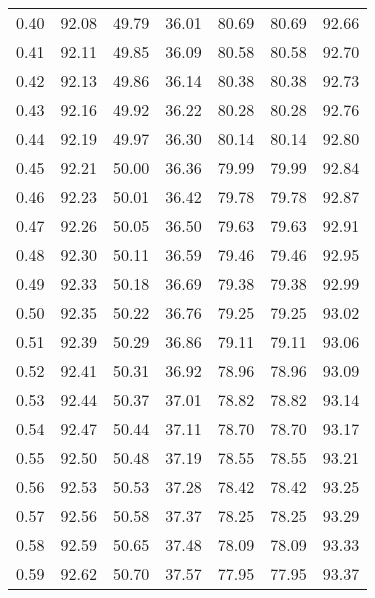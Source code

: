 \begin{tabular}{|c|c|c|c|c|c|c|}
      0.40 &     92.08 &     49.79 &      36.01 &   80.69 &      80.69 &         92.66 \\
      0.41 &     92.11 &     49.85 &      36.09 &   80.58 &      80.58 &         92.70 \\
      0.42 &     92.13 &     49.86 &      36.14 &   80.38 &      80.38 &         92.73 \\
      0.43 &     92.16 &     49.92 &      36.22 &   80.28 &      80.28 &         92.76 \\
      0.44 &     92.19 &     49.97 &      36.30 &   80.14 &      80.14 &         92.80 \\
      0.45 &     92.21 &     50.00 &      36.36 &   79.99 &      79.99 &         92.84 \\
      0.46 &     92.23 &     50.01 &      36.42 &   79.78 &      79.78 &         92.87 \\
      0.47 &     92.26 &     50.05 &      36.50 &   79.63 &      79.63 &         92.91 \\
      0.48 &     92.30 &     50.11 &      36.59 &   79.46 &      79.46 &         92.95 \\
      0.49 &     92.33 &     50.18 &      36.69 &   79.38 &      79.38 &         92.99 \\
      0.50 &     92.35 &     50.22 &      36.76 &   79.25 &      79.25 &         93.02 \\
      0.51 &     92.39 &     50.29 &      36.86 &   79.11 &      79.11 &         93.06 \\
      0.52 &     92.41 &     50.31 &      36.92 &   78.96 &      78.96 &         93.09 \\
      0.53 &     92.44 &     50.37 &      37.01 &   78.82 &      78.82 &         93.14 \\
      0.54 &     92.47 &     50.44 &      37.11 &   78.70 &      78.70 &         93.17 \\
      0.55 &     92.50 &     50.48 &      37.19 &   78.55 &      78.55 &         93.21 \\
      0.56 &     92.53 &     50.53 &      37.28 &   78.42 &      78.42 &         93.25 \\
      0.57 &     92.56 &     50.58 &      37.37 &   78.25 &      78.25 &         93.29 \\
      0.58 &     92.59 &     50.65 &      37.48 &   78.09 &      78.09 &         93.33 \\
      0.59 &     92.62 &     50.70 &      37.57 &   77.95 &      77.95 &         93.37 \\

\end{tabular}
